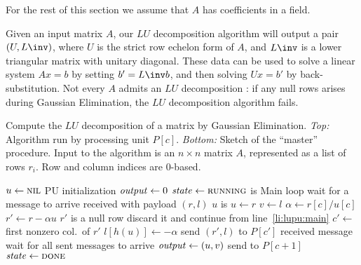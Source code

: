 For the rest of this section we assume that $A$ has coefficients in a
field.

Given an input matrix $A$, our $LU$ decomposition algorithm will
output a pair $(U, L\inv)$, where $U$ is the strict row echelon form
of $A$, and $L\inv$ is a lower triangular matrix with unitary
diagonal.  These data can be used to solve a linear system $Ax = b$ by
setting $b' = L\inv b$, and then solving $Ux = b'$ by
back-substitution.  Not every $A$ admits an $LU$
decomposition \cite{okunev+johnson:2005}: if any null rows arises
during Gaussian Elimination, the $LU$ decomposition algorithm fails.
\begin{Algorithm}
  \caption{Compute the $LU$ decomposition of a matrix by Gaussian
    Elimination. \emph{Top:} Algorithm run by processing unit $P[c]$.
    \emph{Bottom:} Sketch of the ``master'' procedure.  Input to the
    algorithm is an $n \times n$ matrix $A$, represented as a list of
    rows $r_i$. Row and column indices are $0$-based.}
  \label{alg:lu}
  \begin{codebox}
    \li $u \gets \textnormal{\scshape nil}$ \RComment PU initialization
    \li $\id{output} \gets 0$
    \li $\id{state} \gets \const{running}$
    \li \While {} is  
    \RComment Main loop
    \li \Do wait for a message to arrive              \label{li:lupu:main}
    \li   \If received  with payload $(r,l)$
    \li   \Then
    \li     \If $u$ is \nil
    \li     \Then 
              $u \gets r$ 
    \li       $v \gets l$
    \li     \Else                                     \label{li:lupu:elimination}
              $\alpha \gets r[c] / u[c]$
    \li       $r' \gets r - \alpha u$
    \li       \If $r'$ is a null row 
    \li       \Then
                discard it and continue from line~\ref{li:lupu:main}
              \End %
    \li       $c' \gets$ first nonzero col.~of $r'$
    \li       $l[h(u)] \gets -\alpha$
    \li       send $(r', l)$ to $P[c']$
            \End
    \li   \ElseIf received message 
    \li   \Then 
            wait for all sent messages to arrive
    \li     $\id{output} \gets (u, v)$                \label{li:lupu:result}
    \li     send  to $P[c+1]$
    \li     $\id{state} \gets \const{done}$
          \End%
        \End%
    \li \Return {}
    \end{codebox}
    \begin{codebox}

\end{codebox}
\end{Algorithm}
